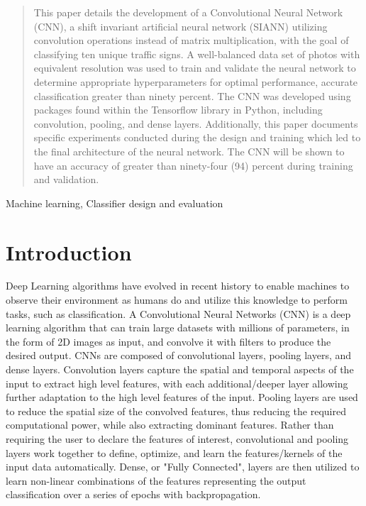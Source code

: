 \documentclass[conference]{IEEEtran}
\begin{document}
\begin{abstract}
This paper details the development of a Convolutional Neural Network (CNN), a shift invariant artificial neural network (SIANN) utilizing convolution operations instead of matrix multiplication, with the goal of classifying ten unique traffic signs. A well-balanced data set of photos with equivalent resolution was used to train and validate the neural network to determine appropriate hyperparameters for optimal performance, accurate classification greater than ninety percent. The CNN was developed using packages found within the Tensorflow library in Python, including convolution, pooling, and dense layers. Additionally, this paper documents specific experiments conducted during the design and training which led to the final architecture of the neural network. The CNN will be shown to have an accuracy of greater than ninety-four (94) percent during training and validation.
\end{abstract}

\begin{IEEEkeywords}
Machine learning, Classifier design and evaluation
\end{IEEEkeywords}

\section{Introduction}
Deep Learning algorithms have evolved in recent history to enable machines to observe their environment as humans do and utilize this knowledge to perform tasks, such as classification. A Convolutional Neural Networks (CNN) is a deep learning algorithm that can train large datasets with millions of parameters, in the form of 2D images as input, and convolve it with filters to produce the desired output\cite{b1}. CNNs are composed of convolutional layers, pooling layers, and dense layers. Convolution layers capture the spatial and temporal aspects of the input to extract high level features, with each additional/deeper layer allowing further adaptation to the high level features of the input. Pooling layers are used to reduce the spatial size of the convolved features, thus reducing the required computational power, while also extracting dominant features. Rather than requiring the user to declare the features of interest, convolutional and pooling layers work together to define, optimize, and learn the features/kernels of the input data automatically. Dense, or "Fully Connected", layers are then utilized to learn non-linear combinations of the features representing the output classification over a series of epochs with backpropagation\cite{b2}.
\end{document}

